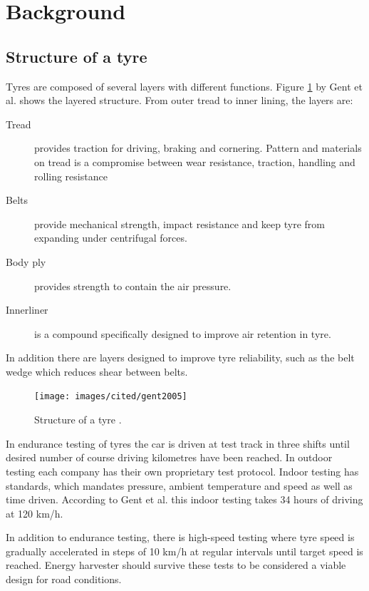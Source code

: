 \section{Background}

\subsection{Structure of a tyre}

Tyres are composed of several layers with different functions. Figure \ref{fig:tyre_structure_diagram} by Gent et
al. \cite{Gent2005} shows the layered structure. From outer tread to inner lining, the layers are: 

\begin{description}
  \item[Tread] provides traction for driving, braking and cornering. Pattern and materials on
tread is a compromise between wear resistance, traction, handling and rolling
resistance
  \item[Belts] provide mechanical strength, impact resistance and keep tyre from expanding
under centrifugal forces.
  \item[Body ply] provides strength to contain the air pressure.
  \item[Innerliner] is a compound specifically designed to improve air retention in tyre.
\end{description}
In addition there are layers designed to improve tyre reliability, such as the belt
wedge which reduces shear between belts.


\begin{figure}[h]
\begin{center}
\texttt{[image: images/cited/gent2005]}
\end{center}
\caption{Structure of a tyre \cite{Gent2005}.}
\label{fig:tyre_structure_diagram}
\end{figure}


In endurance testing of tyres the car is driven at test track in three shifts until
desired number of course driving kilometres have been reached. In outdoor testing
each company has their own proprietary test protocol. Indoor testing has standards,
which mandates pressure, ambient temperature and speed as well as time driven.
According to Gent et al. \cite{Gent2005} this indoor testing takes 34 hours of driving at 120
km/h.

In addition to endurance testing, there is high-speed testing where tyre speed is
gradually accelerated in steps of 10 km/h at regular intervals until target speed is
reached. Energy harvester should survive these tests to be considered a viable design for road conditions.


